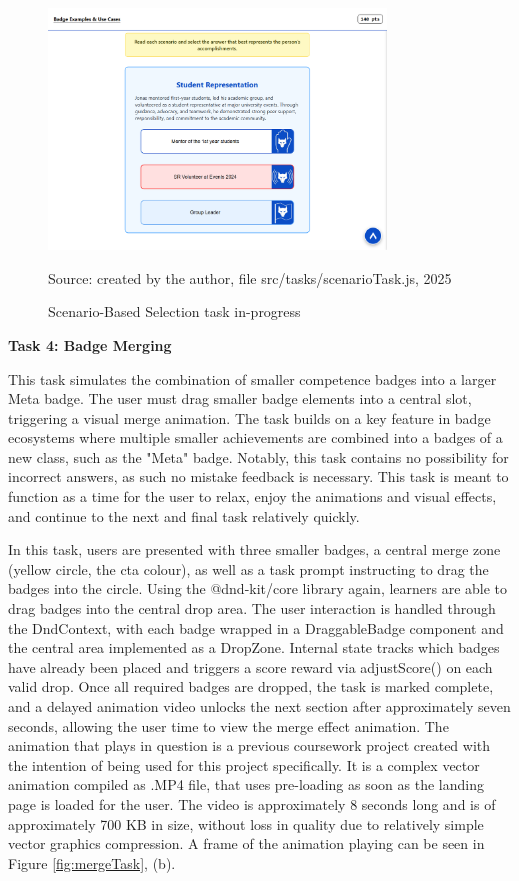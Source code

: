 \begin{figure}[hbtp]
\centering
\includegraphics[width=0.8\textwidth]{Media/scenario.png}
\caption{Scenario-Based Selection task in-progress}
\label{fig:scenarioTask}
{\raggedright \small{Source: created by the author, file src/tasks/scenarioTask.js}, 2025\par}
\end{figure}


\textbf{Task 4: Badge Merging}

This task simulates the combination of smaller competence badges into a larger Meta badge. 
The user must drag smaller badge elements into a central slot, triggering a visual merge animation. 
The task builds on a key feature in badge ecosystems where multiple smaller achievements are combined into a badges of a new class, such as the "Meta" badge.
Notably, this task contains no possibility for incorrect answers, as such no mistake feedback is necessary.
This task is meant to function as a time for the user to relax, enjoy the animations and visual effects, and continue to the next and final task relatively quickly. 

In this task, users are presented with three smaller badges, a central merge zone (yellow circle, the \acrshort{cta} colour), as well as a task prompt instructing to drag the badges into the circle.
Using the @dnd-kit/core library again, learners are able to drag badges into the central drop area. 
The user interaction is handled through the DndContext, with each badge wrapped in a DraggableBadge component and the central area implemented as a DropZone. 
Internal state tracks which badges have already been placed and triggers a score reward via adjustScore() on each valid drop. 
Once all required badges are dropped, the task is marked complete, and a delayed animation video unlocks the next section after approximately seven seconds, allowing the user time to view the merge effect animation.
The animation that plays in question is a previous coursework project created with the intention of being used for this project specifically. 
It is a complex vector animation compiled as .MP4 file, that uses pre-loading as soon as the landing page is loaded for the user. 
The video is approximately 8 seconds long and is of approximately 700 KB in size, without loss in quality due to relatively simple vector graphics compression. 
A frame of the animation playing can be seen in Figure \ref{fig:mergeTask}, (b).

